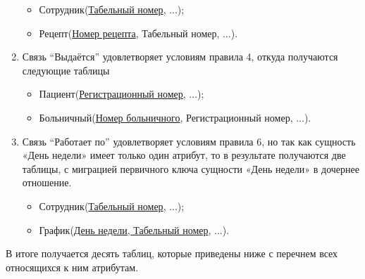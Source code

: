 \documentclass[14pt,a4paper,russian]{extreport}
\begin{document}
\begin{enumerate}[noitemsep]
\begin{itemize}[noitemsep]
            \item Сотрудник(\underline{Табельный номер}, ...);
            \item Рецепт(\underline{Номер рецепта}, Табельный номер, ...).
        \end{itemize}
    \item Связь ``Выдаётся'' удовлетворяет условиям правила 4, откуда получаются следующие
        таблицы
	\begin{itemize}[noitemsep]
            \item Пациент(\underline{Регистрационный номер}, ...);
	    \item Больничный(\underline{Номер больничного}, Регистрационный номер, ...).
        \end{itemize}
    \item Связь ``Работает по'' удовлетворяет условиям правила 6, но так как сущность «День недели» имеет только один атрибут, то в результате получаются две таблицы, с миграцией первичного ключа сущности «День недели» в дочернее отношение.
	\begin{itemize}[noitemsep]
            \item Сотрудник(\underline{Табельный номер}, ...);
            \item График(\underline{День недели, Табельный номер}, ...).
        \end{itemize}
\end{enumerate}
В итоге получается десять таблиц, которые приведены ниже с перечнем всех относящихся к ним атрибутам.
\end{document}
